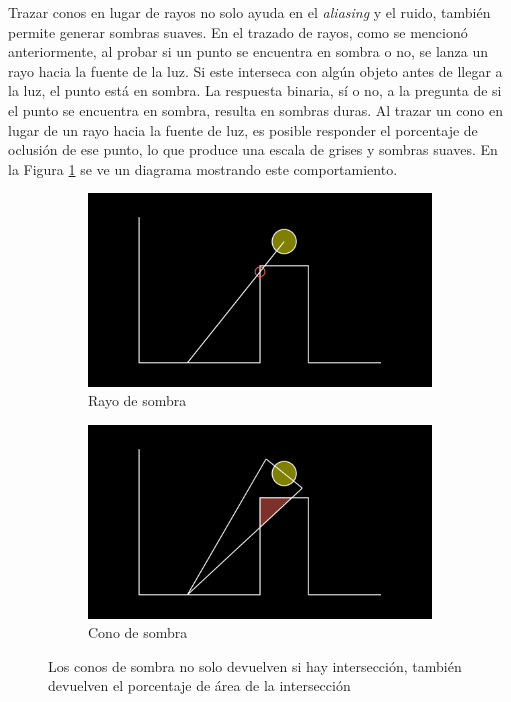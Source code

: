 Trazar conos en lugar de rayos no solo ayuda en el \textit{aliasing} y el ruido, también permite generar sombras suaves.
En el trazado de rayos, como se mencionó anteriormente, al probar si un punto se encuentra en sombra o no, se lanza un rayo hacia la fuente de la luz.
Si este interseca con algún objeto antes de llegar a la luz, el punto está en sombra.
La respuesta binaria, sí o no, a la pregunta de si el punto se encuentra en sombra, resulta en sombras duras.
Al trazar un cono en lugar de un rayo hacia la fuente de luz, es posible responder el porcentaje de oclusión de ese punto, lo que produce una escala de grises y sombras suaves.
En la Figura \ref{fig:shadow-rays-and-cones} se ve un diagrama mostrando este comportamiento.

\begin{figure}
    \begin{center}
    \begin{subfigure}{.49\textwidth}
        \includegraphics[width=\textwidth]{shadow-ray-diagram}
        \caption{Rayo de sombra}
    \end{subfigure}
    \begin{subfigure}{.49\textwidth}
        \includegraphics[width=\textwidth]{shadow-cone-diagram}
        \caption{Cono de sombra}
    \end{subfigure}
    \caption{Los conos de sombra no solo devuelven si hay intersección, también devuelven el porcentaje de área de la intersección}
    \label{fig:shadow-rays-and-cones}
    \end{center}
\end{figure}

